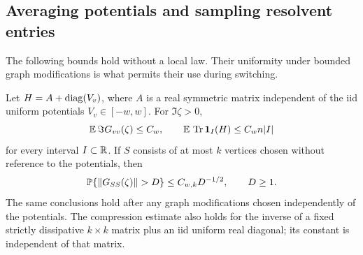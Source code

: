 \subsection{Averaging potentials and sampling resolvent entries}

The following bounds hold without a local law.  Their uniformity under
bounded graph modifications is what permits their use during switching.

\begin{lemma}
\label{lem:spectral-averaging}
Let $H=A+\operatorname{diag}(V_v)$, where $A$ is a real symmetric matrix independent
of the iid uniform potentials $V_v\in[-w,w]$.  For $\Im\zeta>0$,
\begin{equation}\label{eq:site-averaging}
 \mathbb E\,\Im G_{vv}(\zeta)\le C_w,
 \qquad
 \mathbb E\,\operatorname{Tr}\mathbf1_I(H)\le C_w n|I|
\end{equation}
for every interval $I\subset\mathbb R$.  If $S$ consists of at most $k$ vertices
chosen without reference to the potentials, then
\begin{equation}\label{eq:compression-tail}
 \PP\{\|G_{SS}(\zeta)\|>D\}\le C_{w,k}D^{-1/2},\qquad D\ge1.
\end{equation}
The same conclusions hold after any graph modifications chosen
independently of the potentials.  The compression estimate also holds
for the inverse of a fixed strictly dissipative $k\times k$ matrix plus
an iid uniform real diagonal; its constant is independent of that matrix.
\end{lemma}

